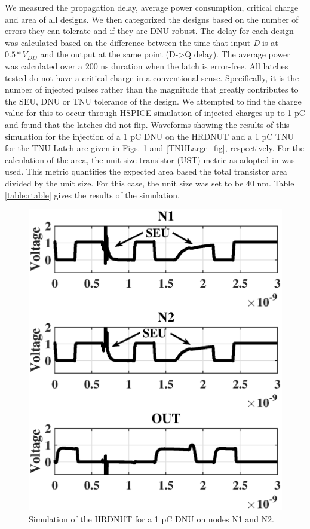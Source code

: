 We measured the propagation delay, average power consumption, critical charge and area of all designs. We then categorized the designs based on the number of errors they can tolerate and if they are DNU-robust. The delay for each design was calculated based on the difference between the time that input \textit{D} is at $0.5*V_{DD}$ and the output at the same point (D-\textgreater Q delay). The average power was calculated over a 200 ns duration when the latch is error-free. All latches tested do not have a critical charge in a conventional sense. Specifically, it is the number of injected pulses rather than the magnitude that greatly contributes to the SEU, DNU or TNU tolerance of the design. We attempted to find the charge value for this to occur through HSPICE simulation of injected charges up to 1 pC and found that the latches did not flip. Waveforms showing the results of this simulation for the injection of a 1 pC DNU on the HRDNUT and a 1 pC TNU for the TNU-Latch are given in Figs. \ref{DNULarge_fig} and \ref{TNULarge_fig}, respectively. For the calculation of the area, the unit size transistor (UST) metric as adopted in \cite{DNCS} was used. This metric quantifies the expected area based the total transistor area divided by the unit size. For this case, the unit size was set to be 40 nm. Table \ref{table:rtable} gives the results of the simulation.

\begin{figure}[!htbp]
	\centering
	\includegraphics[width=0.55\linewidth]{Figures/DNULargeCharge}
	\caption{Simulation of the HRDNUT for a 1 pC DNU on nodes N1 and N2.}
	\label{DNULarge_fig}
\end{figure}

